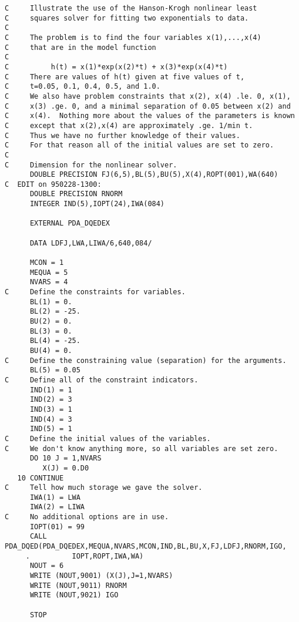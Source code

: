 \begin{verbatim}
C     Illustrate the use of the Hanson-Krogh nonlinear least
C     squares solver for fitting two exponentials to data.
C
C     The problem is to find the four variables x(1),...,x(4)
C     that are in the model function
C
C          h(t) = x(1)*exp(x(2)*t) + x(3)*exp(x(4)*t)
C     There are values of h(t) given at five values of t,
C     t=0.05, 0.1, 0.4, 0.5, and 1.0.
C     We also have problem constraints that x(2), x(4) .le. 0, x(1),
C     x(3) .ge. 0, and a minimal separation of 0.05 between x(2) and
C     x(4).  Nothing more about the values of the parameters is known
C     except that x(2),x(4) are approximately .ge. 1/min t.
C     Thus we have no further knowledge of their values.
C     For that reason all of the initial values are set to zero.
C
C     Dimension for the nonlinear solver.
      DOUBLE PRECISION FJ(6,5),BL(5),BU(5),X(4),ROPT(001),WA(640)
C  EDIT on 950228-1300:
      DOUBLE PRECISION RNORM
      INTEGER IND(5),IOPT(24),IWA(084)

      EXTERNAL PDA_DQEDEX

      DATA LDFJ,LWA,LIWA/6,640,084/

      MCON = 1
      MEQUA = 5
      NVARS = 4
C     Define the constraints for variables.
      BL(1) = 0.
      BL(2) = -25.
      BU(2) = 0.
      BL(3) = 0.
      BL(4) = -25.
      BU(4) = 0.
C     Define the constraining value (separation) for the arguments.
      BL(5) = 0.05
C     Define all of the constraint indicators.
      IND(1) = 1
      IND(2) = 3
      IND(3) = 1
      IND(4) = 3
      IND(5) = 1
C     Define the initial values of the variables.
C     We don't know anything more, so all variables are set zero.
      DO 10 J = 1,NVARS
         X(J) = 0.D0
   10 CONTINUE
C     Tell how much storage we gave the solver.
      IWA(1) = LWA
      IWA(2) = LIWA
C     No additional options are in use.
      IOPT(01) = 99
      CALL PDA_DQED(PDA_DQEDEX,MEQUA,NVARS,MCON,IND,BL,BU,X,FJ,LDFJ,RNORM,IGO,
     .          IOPT,ROPT,IWA,WA)
      NOUT = 6
      WRITE (NOUT,9001) (X(J),J=1,NVARS)
      WRITE (NOUT,9011) RNORM
      WRITE (NOUT,9021) IGO

      STOP


\end{verbatim}
